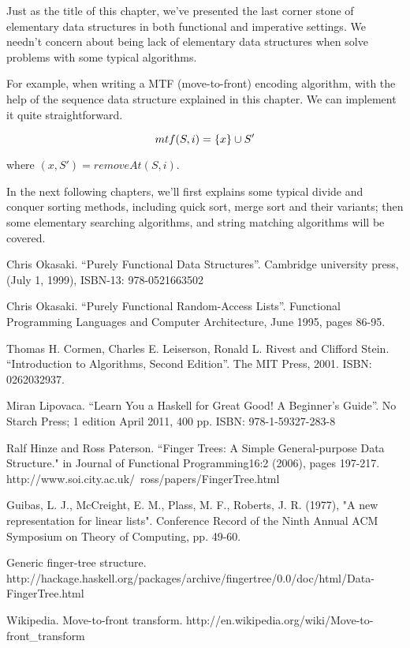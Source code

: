 \documentclass[UTF8]{article}
\begin{document}
Just as the title of this chapter, we've presented the last corner stone of
elementary data structures in both functional and imperative settings.
We needn't concern about being lack of elementary data structures when
solve problems with some typical algorithms.

For example, when writing a MTF (move-to-front) encoding algorithm\cite{mtf-wiki}, with
the help of the sequence data structure explained in this chapter. We can
implement it quite straightforward.

\[
mtf(S, i) = \{x\} \cup S' \\
\]

where $(x, S') = removeAt(S, i)$.

In the next following chapters, we'll first explains some typical divide and conquer
sorting methods, including quick sort, merge sort and their variants; then
some elementary searching algorithms, and string matching algorithms will be
covered.


\begin{thebibliography}{99}

Chris Okasaki. ``Purely Functional Data Structures''. Cambridge university press, (July 1, 1999), ISBN-13: 978-0521663502

Chris Okasaki. ``Purely Functional Random-Access Lists''. Functional Programming Languages and Computer Architecture, June 1995, pages 86-95.

Thomas H. Cormen, Charles E. Leiserson, Ronald L. Rivest and Clifford Stein. ``Introduction to Algorithms, Second Edition''. The MIT Press, 2001. ISBN: 0262032937.

Miran Lipovaca. ``Learn You a Haskell for Great Good! A Beginner's Guide''. No Starch Press; 1 edition April 2011, 400 pp. ISBN: 978-1-59327-283-8

Ralf Hinze and Ross Paterson. ``Finger Trees: A Simple General-purpose Data Structure." in Journal of Functional Programming16:2 (2006), pages 197-217. http://www.soi.city.ac.uk/~ross/papers/FingerTree.html

Guibas, L. J., McCreight, E. M., Plass, M. F., Roberts, J. R. (1977), "A new representation for linear lists". Conference Record of the Ninth Annual ACM Symposium on Theory of Computing, pp. 49-60.

Generic finger-tree structure. http://hackage.haskell.org/packages/archive/fingertree/0.0/doc/html/Data-FingerTree.html

Wikipedia. Move-to-front transform. http://en.wikipedia.org/wiki/Move-to-front\_transform

\end{thebibliography}

\ifx\wholebook\relax \else
\end{document}
